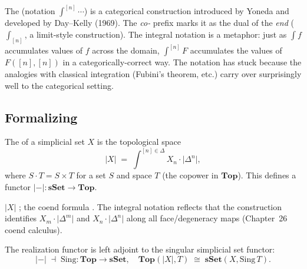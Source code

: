 \begin{nameorigin}
The  (notation $\int^{[n]} \cdots$) is a categorical
construction introduced by Yoneda and developed by Day–Kelly (1969). The
\emph{co-} prefix marks it as the dual of the \emph{end} ($\int_{[n]}$,
a limit-style construction). The integral notation is a metaphor: just
as $\int f$ accumulates values of $f$ across the domain, $\int^{[n]} F$
accumulates the values of $F([n], [n])$ in a categorically-correct way.
The notation has stuck because the analogies with classical integration
(Fubini's theorem, etc.) carry over surprisingly well to the categorical
setting.
\end{nameorigin}

\subsection{Formalizing}

\begin{definition}
\label{def:geometric-realization}
The  of a simplicial set $X$ is the
topological space
\begin{equation*}
  \lvert X\rvert \;=\; \int^{[n] \in \Delta} X_n \cdot \lvert\Delta^n\rvert,
\end{equation*}
where $S \cdot T = S \times T$ for a set $S$ and space $T$ (the copower
in $\mathbf{Top}$). This defines a functor $\lvert{-}\rvert : \mathbf{sSet}
\to \mathbf{Top}$.
\end{definition}

\begin{howtosay}
$\lvert X\rvert$ ; the coend formula
. The integral notation reflects that the construction
identifies $X_m \cdot \lvert\Delta^m\rvert$ and $X_n \cdot
\lvert\Delta^n\rvert$ along all face/degeneracy maps (Chapter~26 coend
calculus).
\end{howtosay}

\begin{theorem}
\label{thm:realization-sing-adj}
The realization functor is left adjoint to the singular simplicial set
functor:
\begin{equation*}
  \lvert{-}\rvert \;\dashv\; \mathrm{Sing} : \mathbf{Top} \to \mathbf{sSet}, \quad
  \mathbf{Top}(\lvert X\rvert, T) \;\cong\; \mathbf{sSet}(X, \mathrm{Sing}\, T).
\end{equation*}
\end{theorem}

